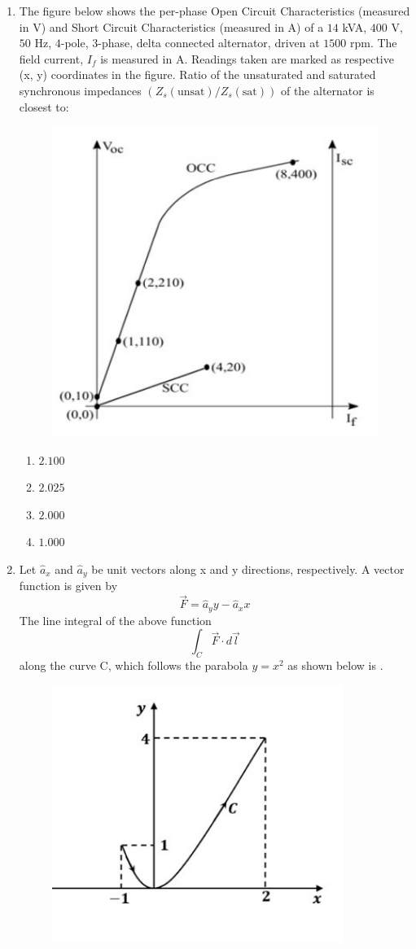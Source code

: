\documentclass[journal,12pt,onecolumn]{IEEEtran}
\theoremstyle{remark}
\begin{document}
\begin{enumerate}[start=1, label=Q.\arabic*]
    \item The figure below shows the per-phase Open Circuit Characteristics (measured in V) and Short Circuit Characteristics (measured in A) of a $14$ kVA, $400$ V, $50$ Hz, $4$-pole, $3$-phase, delta connected alternator, driven at $1500$ rpm. The field current, $I_f$ is measured in A. Readings taken are marked as respective (x, y) coordinates in the figure. Ratio of the unsaturated and saturated synchronous impedances $(Z_s(\text{unsat}) / Z_s(\text{sat}))$ of the alternator is closest to:
    \begin{figure}[H]
        \centering
        \includegraphics[width=0.6\columnwidth]{Figures/qs53.png}
        \caption{}
    \end{figure}
    \begin{enumerate}
        \item $2.100$
        \item $2.025$
        \item $2.000$
        \item $1.000$
    \end{enumerate}

    \hfill{}

    \item Let $\hat{a}_x$ and $\hat{a}_y$ be unit vectors along x and y directions, respectively. A vector function is given by
    \[ \vec{F} = \hat{a}_y y - \hat{a}_x x \]
    The line integral of the above function
    \[ \int_C \vec{F} \cdot d\vec{l} \]
    along the curve C, which follows the parabola $y=x^2$ as shown below is \underline{\hspace{2cm}} .
    \begin{figure}[H]
        \centering
        \includegraphics[width=0.4\columnwidth]{Figures/qs54.png}
        \caption{}
    \end{figure}


\end{enumerate}
\end{document}
